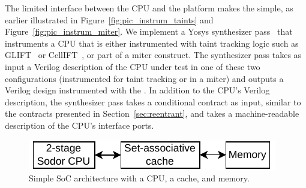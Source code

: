 The limited interface between the CPU and the platform makes the \PICIs simple, as earlier illustrated in Figure~\ref{fig:pic_instrum_taints} and Figure~\ref{fig:pic_instrum_miter}.
We implement a Yosys synthesizer pass~\cite{wolf2013yosys} that instruments a CPU that is either instrumented with taint tracking logic such as GLIFT~\cite{tiwari2009complete} or CellIFT~\cite{solt2022cellift}, or part of a miter construct.
The synthesizer pass takes as input a Verilog description of the CPU under test in one of these two configurations (instrumented for taint tracking or in a miter) and outputs a Verilog design instrumented with the \PICI.
In addition to the CPU's Verilog description, the synthesizer pass takes a conditional contract as input, similar to the contracts presented in Section~\ref{sec:reentrant}, and takes a machine-readable description of the CPU's interface ports.

\begin{figure}[t]
    \begin{center}
    \includegraphics[width=0.80\columnwidth]{figures/simple_soc/simple_soc.pdf}
    \end{center}
    \vspace*{-1em}
    \caption{\label{fig:simple_soc} Simple SoC architecture with a CPU, a cache, and memory.}
    \vspace*{-1.4em}
\end{figure}

